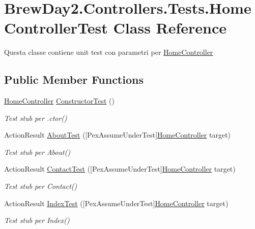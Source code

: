 \hypertarget{class_brew_day2_1_1_controllers_1_1_tests_1_1_home_controller_test}{}\section{Brew\+Day2.\+Controllers.\+Tests.\+Home\+Controller\+Test Class Reference}
\label{class_brew_day2_1_1_controllers_1_1_tests_1_1_home_controller_test}


Questa classe contiene unit test con parametri per \mbox{\hyperlink{class_brew_day2_1_1_controllers_1_1_home_controller}{Home\+Controller}} 


\subsection*{Public Member Functions}
\begin{DoxyCompactItemize}
\item 
\mbox{\hyperlink{class_brew_day2_1_1_controllers_1_1_home_controller}{Home\+Controller}} \mbox{\hyperlink{class_brew_day2_1_1_controllers_1_1_tests_1_1_home_controller_test_a8982199b6a401e2e9624c4be27d0e5af}{Constructor\+Test}} ()
\begin{DoxyCompactList}\small\item\em Test stub per .ctor()\end{DoxyCompactList}\item 
Action\+Result \mbox{\hyperlink{class_brew_day2_1_1_controllers_1_1_tests_1_1_home_controller_test_a50a2f7e98d422bc1553c18bb0daf4e91}{About\+Test}} (\mbox{[}Pex\+Assume\+Under\+Test\mbox{]}\mbox{\hyperlink{class_brew_day2_1_1_controllers_1_1_home_controller}{Home\+Controller}} target)
\begin{DoxyCompactList}\small\item\em Test stub per About()\end{DoxyCompactList}\item 
Action\+Result \mbox{\hyperlink{class_brew_day2_1_1_controllers_1_1_tests_1_1_home_controller_test_a3d3700bb273d47937809f43cc9457f43}{Contact\+Test}} (\mbox{[}Pex\+Assume\+Under\+Test\mbox{]}\mbox{\hyperlink{class_brew_day2_1_1_controllers_1_1_home_controller}{Home\+Controller}} target)
\begin{DoxyCompactList}\small\item\em Test stub per Contact()\end{DoxyCompactList}\item 
Action\+Result \mbox{\hyperlink{class_brew_day2_1_1_controllers_1_1_tests_1_1_home_controller_test_ae15cfe56bb2ed55409c507f912e0f34d}{Index\+Test}} (\mbox{[}Pex\+Assume\+Under\+Test\mbox{]}\mbox{\hyperlink{class_brew_day2_1_1_controllers_1_1_home_controller}{Home\+Controller}} target)
\begin{DoxyCompactList}\small\item\em Test stub per Index()\end{DoxyCompactList}\end{DoxyCompactItemize}


